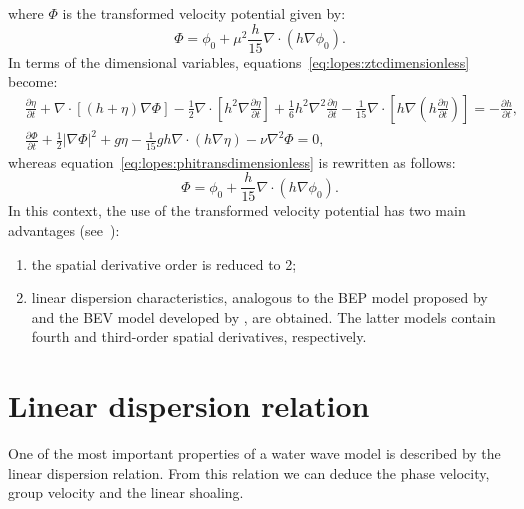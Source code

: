where $\Phi$ is the transformed velocity potential given by:
\begin{equation}
  \label{eq:lopes:phitransdimensionless}
  \Phi=\phi_0+\mu^2\frac{h}{15}\nabla\cdot(h\nabla\phi_0).
\end{equation}
In terms of the dimensional variables,
equations~\eqref{eq:lopes:ztcdimensionless} become:
\begin{subequations}
  \label{eq:lopes:ztc}
  \begin{align}
    &\frac{\partial\eta}{\partial t}
    +\nabla\cdot[(h+\eta)\nabla{\Phi}] -\frac{1}{2}\nabla\cdot
    [h^{2}\nabla\frac{\partial \eta} {\partial t}]
    +\frac{1}{6}h^{2}\nabla^2\frac{\partial\eta}{\partial t}
    -\frac{1}{15}\nabla\cdot[h\nabla(h\frac{\partial\eta}
    {\partial t})] = -\frac{\partial h}{\partial t},
    \label{eq:lopes:ztc-a}\\ &\frac{\partial\Phi} {\partial t}
    +\frac{1}{2}|\nabla\Phi|^2+g\eta- \frac{1}{15}gh\nabla \cdot
    (h\nabla\eta)-\nu\nabla^2\Phi=0,
    \label{eq:lopes:ztc-b}
  \end{align}
\end{subequations}
whereas equation~\eqref{eq:lopes:phitransdimensionless} is rewritten
as follows:
\begin{equation}
  \label{eq:lopes:phitrans}
  \Phi=\phi_0+\frac{h}{15}\nabla\cdot(h\nabla\phi_0).
\end{equation}
In this context, the use of the transformed velocity potential has two
main advantages (see~\citet{ZhaoTengCheng2004}):
\begin{enumerate}
\item the spatial derivative order is reduced to 2;
\item linear dispersion characteristics, analogous to the
  BEP model proposed by \citet{ChenLiu1994} and the  BEV model
  developed by \citet{Nwogu1993}, are obtained. The latter models
  contain fourth and third-order spatial derivatives, respectively.
\end{enumerate}

\section{Linear dispersion relation}
\label{sec:lopes:dispersionproperties}

One of the most important properties of a water wave model is
described by the linear dispersion relation.  From this relation we
can deduce the phase velocity, group velocity and the linear shoaling.

